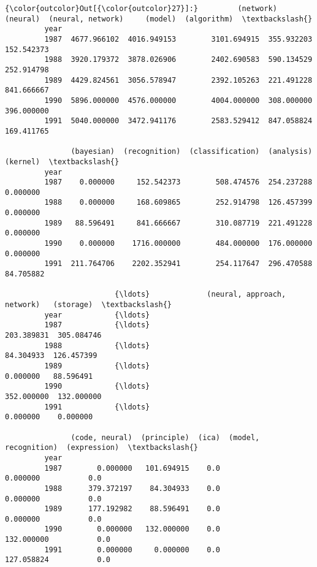 \documentclass[11pt]{article}
\begin{document}
\begin{Verbatim}[commandchars=\\\{\}]
{\color{outcolor}Out[{\color{outcolor}27}]:}         (network)     (neural)  (neural, network)     (model)  (algorithm)  \textbackslash{}
         year                                                                         
         1987  4677.966102  4016.949153        3101.694915  355.932203   152.542373   
         1988  3920.179372  3878.026906        2402.690583  590.134529   252.914798   
         1989  4429.824561  3056.578947        2392.105263  221.491228   841.666667   
         1990  5896.000000  4576.000000        4004.000000  308.000000   396.000000   
         1991  5040.000000  3472.941176        2583.529412  847.058824   169.411765   
         
               (bayesian)  (recognition)  (classification)  (analysis)   (kernel)  \textbackslash{}
         year                                                                       
         1987    0.000000     152.542373        508.474576  254.237288   0.000000   
         1988    0.000000     168.609865        252.914798  126.457399   0.000000   
         1989   88.596491     841.666667        310.087719  221.491228   0.000000   
         1990    0.000000    1716.000000        484.000000  176.000000   0.000000   
         1991  211.764706    2202.352941        254.117647  296.470588  84.705882   
         
                         {\ldots}             (neural, approach, network)   (storage)  \textbackslash{}
         year            {\ldots}                                                       
         1987            {\ldots}                              203.389831  305.084746   
         1988            {\ldots}                               84.304933  126.457399   
         1989            {\ldots}                                0.000000   88.596491   
         1990            {\ldots}                              352.000000  132.000000   
         1991            {\ldots}                                0.000000    0.000000   
         
               (code, neural)  (principle)  (ica)  (model, recognition)  (expression)  \textbackslash{}
         year                                                                           
         1987        0.000000   101.694915    0.0              0.000000           0.0   
         1988      379.372197    84.304933    0.0              0.000000           0.0   
         1989      177.192982    88.596491    0.0              0.000000           0.0   
         1990        0.000000   132.000000    0.0            132.000000           0.0   
         1991        0.000000     0.000000    0.0            127.058824           0.0   
         

\end{Verbatim}
\end{document}
